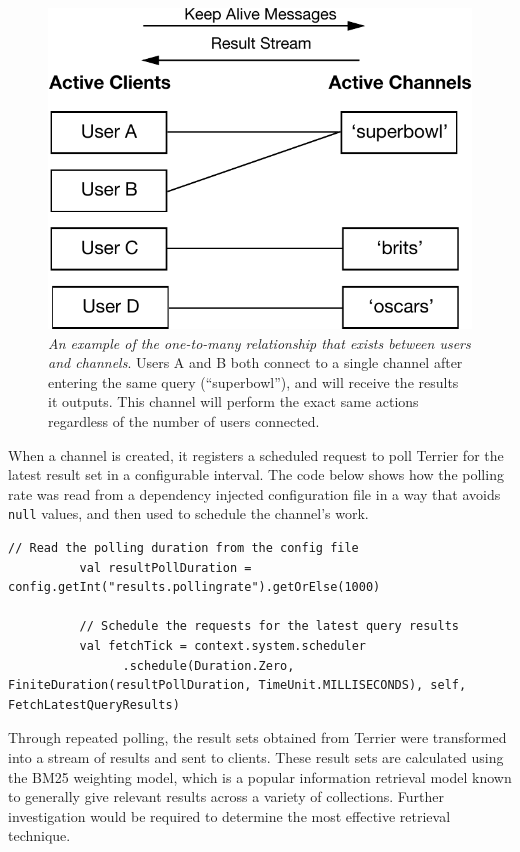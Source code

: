 \documentclass{l4proj}
\newcommand{\code}[1]{\texttt{#1}}
\begin{document}
\begin{figure}
\centering
\includegraphics[scale=0.75]{channels.pdf}
\caption{\textit{An example of the one-to-many relationship that exists between users and channels}. Users A and B both connect to a single channel after entering the same query (``superbowl''), and will receive the results it outputs. This channel will perform the exact same actions regardless of the number of users connected.}
\label{channels}
\end{figure}     
        
        When a channel is created, it registers a scheduled request to poll Terrier for the latest result set in a configurable interval. The code below shows how the polling rate was read from a dependency injected configuration file in a way that avoids \code{null} values, and then used to schedule the channel's work.
        
        \begin{lstlisting}[caption=Reading configuration from a file and scheduling the updates of results.]
          // Read the polling duration from the config file  
          val resultPollDuration = config.getInt("results.pollingrate").getOrElse(1000)
          
          // Schedule the requests for the latest query results
          val fetchTick = context.system.scheduler
                .schedule(Duration.Zero, FiniteDuration(resultPollDuration, TimeUnit.MILLISECONDS), self, FetchLatestQueryResults)
        \end{lstlisting}

        Through repeated polling, the result sets obtained from Terrier were transformed into a stream of results and sent to clients. These result sets are calculated using the BM25 weighting model, which is a popular information retrieval model known to generally give relevant results across a variety of collections. Further investigation would be required to determine the most effective retrieval technique.
        
\end{document}
